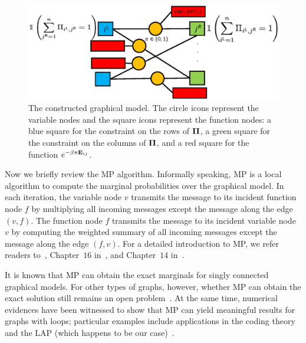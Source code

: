 \documentclass[11pt]{article}
\begin{document}
\begin{figure}[h]
\centering

\vspace{-0.1in}
\includegraphics[width = 6in]{figs/whole_graphv4.eps}	


\caption{The constructed graphical model.
The circle icons represent the  variable nodes and  the square icons
represent the function nodes: a blue square  for  the constraint on the rows of $\boldsymbol{\Pi}$, a green square   for the constraint on the columns of $\boldsymbol{\Pi}$, and a red square  for the function $e^{-\beta \pi \mathbf{E}_{ij}}$.}\label{fig:whole_graph}%
\end{figure}




Now we briefly review the MP algorithm. Informally speaking, MP is a local algorithm to
compute the
marginal probabilities over the graphical model.
In each iteration, the variable node $v$ transmits the message to its
incident function node $f$ by multiplying all incoming messages
except the message along the edge $(v, f)$.  The function node $f$ transmits the message to its incident
variable node $v$ by computing the weighted summary of all incoming
messages except the message along the edge $(f, v)$. For a detailed introduction  to MP, we refer readers to~\citet{kschischang2001factor}, Chapter~$16$ in~\citet{mackay2003information}, and Chapter~$14$ in~\citet{mezard2009information}.




It is known that MP can obtain the exact marginals
\citep{mezard2009information} for singly connected graphical models.
For other types of graphs, however, whether MP can obtain the
exact solution still remains an open problem~\citep{cantwell2019, kirkley2021}.
At the same time,   numerical evidences have been witnessed to show that  MP can yield meaningful results for graphs
with loops; particular examples include  applications in the coding theory~\citep{chung2000construction, richardson2001capacity, richardson2008modern}
and the LAP (which happens to be our case)~\citep{mezard2009information, chertkov2010inference, caracciolo2017finite, malatesta2019fluctuations, semerjian2020recovery}.
\end{document}
